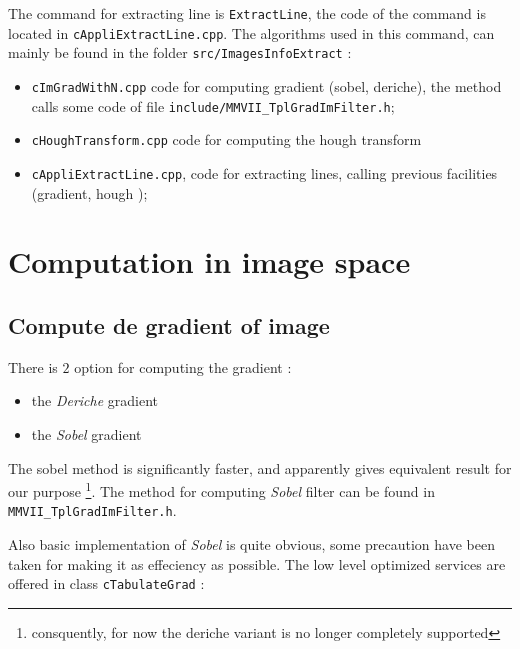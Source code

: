 The command for extracting line is {\tt ExtractLine}, the code of the command is
located in {\tt cAppliExtractLine.cpp}.  The algorithms used in this command,
can mainly be found in the folder {\tt src/ImagesInfoExtract} :

\begin{itemize}
    \item  {\tt cImGradWithN.cpp}  code for computing gradient (sobel, deriche),
           the method calls some code of file {\tt include/MMVII\_TplGradImFilter.h};


    \item  {\tt cHoughTransform.cpp}  code for computing the hough transform

    \item  {\tt cAppliExtractLine.cpp}, code for extracting lines, calling previous
           facilities (gradient, hough );
\end{itemize}


\section{Computation in image space}

\subsection{Compute de gradient of image}
There is  $2$ option for computing the gradient :

\begin{itemize}
    \item   the \emph{Deriche} gradient
    \item   the \emph{Sobel} gradient
\end{itemize}

The sobel method is significantly faster, and apparently gives equivalent result for our purpose
\footnote{consquently, for now  the deriche variant is no longer completely supported}.
The method for computing \emph{Sobel} filter can be found in {\tt MMVII\_TplGradImFilter.h}.

Also basic implementation of \emph{Sobel}  is quite obvious,  some precaution have been
taken for making it as effeciency as possible.  The low level optimized services are offered
in  class {\tt cTabulateGrad} :


